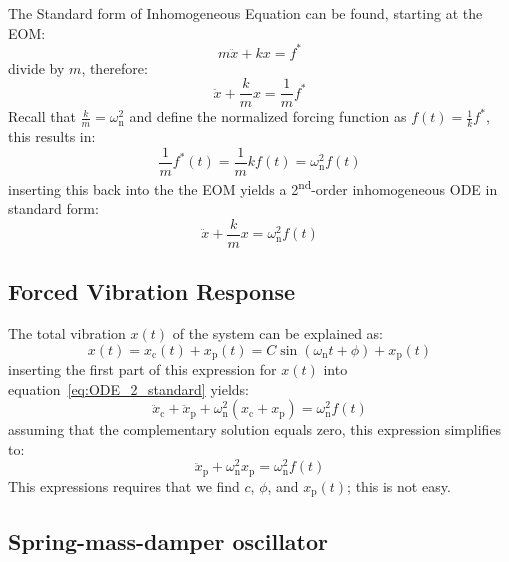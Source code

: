 \documentclass[12pt,letter]{article}
\begin{document}
The Standard form of Inhomogeneous Equation can be found, starting at the EOM:
\begin{equation}
m \ddot{x} + kx = f^*
\end{equation}
divide by $m$, therefore:
\begin{equation}
\ddot{x} + \frac{k}{m}x = \frac{1}{m}f^*
\end{equation}
Recall that $\frac{k}{m} = \omega_\text{n}^2$ and define the normalized forcing function as $f(t) = \frac{1}{k}f^*$, this results in:
\begin{equation}
\frac{1}{m}f^*(t) = \frac{1}{m}kf(t) = \omega_\text{n}^2 f(t)
\end{equation}
inserting this back into the the EOM yields a 2\textsuperscript{nd}-order inhomogeneous ODE in standard form:
\begin{equation}
\ddot{x} + \frac{k}{m}x = \omega_\text{n}^2 f(t)
\label{eq:ODE_2_standard}
\end{equation}


\subsection{Forced Vibration Response}

The total vibration $x(t)$ of the system can be explained as:
\begin{equation}
x(t) = x_\text{c}(t) + x_\text{p}(t) = C \sin(\omega_\text{n}t + \phi) + x_\text{p}(t)
\end{equation}
inserting the first part of this expression for $x(t)$ into equation~\ref{eq:ODE_2_standard} yields:
\begin{equation}
\ddot{x}_\text{c} + \ddot{x}_\text{p} + \omega_\text{n}^2(x_\text{c} + x_\text{p}) = \omega_\text{n}^2 f(t)
\end{equation}
assuming that the complementary solution equals zero, this expression simplifies to:
\begin{equation}
\ddot{x}_\text{p} + \omega_\text{n}^2x_\text{p} = \omega_\text{n}^2 f(t)
\end{equation}
This expressions requires that we find $c$, $\phi$, and $x_\text{p}(t)$; this is not easy. 

\subsection{Spring-mass-damper oscillator}
\end{document}
